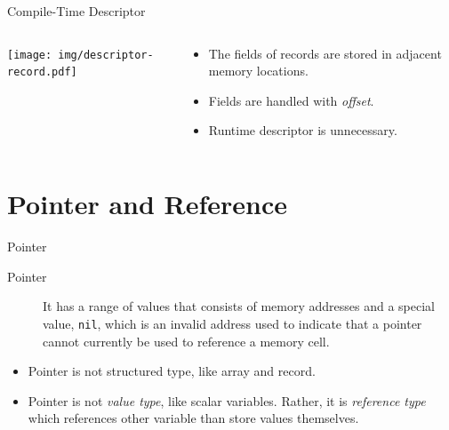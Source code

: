 \documentclass[presentation]{beamer}
\begin{document}
\begin{frame}[label={sec:orgheadline43}]{Compile-Time Descriptor}
\begin{columns}
\begin{column}{0.4\columnwidth}
\texttt{[image: img/descriptor-record.pdf]}
\end{column}

\begin{column}{0.6\columnwidth}
\begin{itemize}
\item The fields of records are stored in adjacent memory locations.
\item Fields are handled with \emph{offset}.
\item Runtime descriptor is unnecessary.
\end{itemize}
\end{column}
\end{columns}
\end{frame}

\section{Pointer and Reference}
\label{sec:orgheadline58}

\begin{frame}[fragile,label={sec:orgheadline45}]{Pointer}
 \begin{description}
\item[{Pointer}] It has a range of values that consists of memory
addresses and a special value, \texttt{nil}, which is an invalid
address used to indicate that a pointer cannot currently be
used to reference a memory cell.
\end{description}


\begin{itemize}
\item Pointer is not structured type, like array and record.
\item Pointer is not \emph{value type}, like scalar variables.  Rather, it
is \emph{reference type} which references other variable than store
values themselves.
\end{itemize}
\end{frame}
\end{document}
